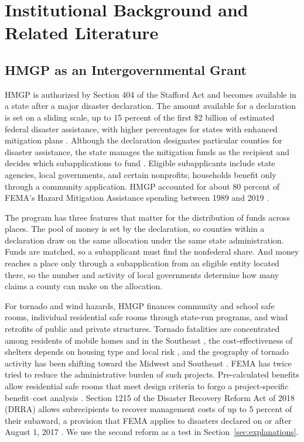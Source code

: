\section{Institutional Background and Related Literature}
\label{sec:background}

\subsection{HMGP as an Intergovernmental Grant}
\label{sec:hmgp}

HMGP is authorized by Section 404 of the Stafford Act and becomes available in a state after a major disaster declaration. The amount available for a declaration is set on a sliding scale, up to 15 percent of the first \$2 billion of estimated federal disaster assistance, with higher percentages for states with enhanced mitigation plans \parencite{horn2022crs}. Although the declaration designates particular counties for disaster assistance, the state manages the mitigation funds as the recipient and decides which subapplications to fund \parencite{horn2022crs}. Eligible subapplicants include state agencies, local governments, and certain nonprofits; households benefit only through a community application. HMGP accounted for about 80 percent of FEMA's Hazard Mitigation Assistance spending between 1989 and 2019 \parencite{frimpong2023federal}.

The program has three features that matter for the distribution of funds across places. The pool of money is set by the declaration, so counties within a declaration draw on the same allocation under the same state administration. Funds are matched, so a subapplicant must find the nonfederal share. And money reaches a place only through a subapplication from an eligible entity located there, so the number and activity of local governments determine how many claims a county can make on the allocation.

For tornado and wind hazards, HMGP finances community and school safe rooms, individual residential safe rooms through state-run programs, and wind retrofits of public and private structures. Tornado fatalities are concentrated among residents of mobile homes and in the Southeast \parencite{ashley2007fatalities,sutter2010mobile}, the cost-effectiveness of shelters depends on housing type and local risk \parencite{merrell2005casualties,simmons2006shelters}, and the geography of tornado activity has been shifting toward the Midwest and Southeast \parencite{gensini2018trends}. FEMA has twice tried to reduce the administrative burden of such projects. Pre-calculated benefits allow residential safe rooms that meet design criteria to forgo a project-specific benefit--cost analysis \parencite{fema2015saferoomprecalc,fema2024bcapolicy}. Section 1215 of the Disaster Recovery Reform Act of 2018 (DRRA) \parencite{drra2018} allows subrecipients to recover management costs of up to 5 percent of their subaward, a provision that FEMA applies to disasters declared on or after August 1, 2017 \parencite{fema1215mgmtcosts}. We use the second reform as a test in Section~\ref{sec:explanations}.

